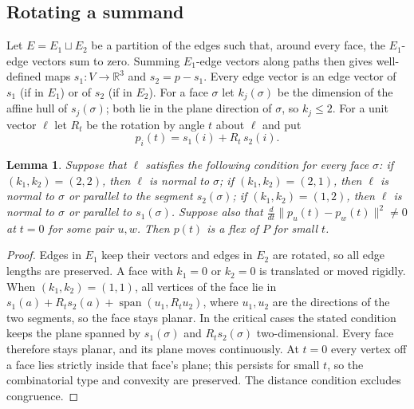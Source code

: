 \documentclass[11pt]{amsart}
\newtheorem{lemma}[theorem]{Lemma}
\theoremstyle{remark}
\newcommand{\R}{\mathbb R}
\begin{document}
\subsection{Rotating a summand}
Let $E=E_1\sqcup E_2$ be a partition of the edges such that, around every face, the $E_1$-edge vectors sum to zero. Summing $E_1$-edge vectors along paths then gives well-defined maps $s_1:V\to\R^3$ and $s_2=p-s_1$. Every edge vector is an edge vector of $s_1$ (if in $E_1$) or of $s_2$ (if in $E_2$). For a face $\sigma$ let $k_j(\sigma)$ be the dimension of the affine hull of $s_j(\sigma)$; both lie in the plane direction of $\sigma$, so $k_j\le2$. For a unit vector $\ell$ let $R_t$ be the rotation by angle $t$ about $\ell$ and put
\[
p_i(t)=s_1(i)+R_t\,s_2(i).
\]

\begin{lemma}\label{lem:mink}
Suppose that $\ell$ satisfies the following condition for every face $\sigma$: if $(k_1,k_2)=(2,2)$, then $\ell$ is normal to $\sigma$; if $(k_1,k_2)=(2,1)$, then $\ell$ is normal to $\sigma$ or parallel to the segment $s_2(\sigma)$; if $(k_1,k_2)=(1,2)$, then $\ell$ is normal to $\sigma$ or parallel to $s_1(\sigma)$. Suppose also that $\frac{d}{dt}\|p_u(t)-p_w(t)\|^2\neq0$ at $t=0$ for some pair $u,w$. Then $p(t)$ is a flex of $P$ for small $t$.
\end{lemma}

\begin{proof}
Edges in $E_1$ keep their vectors and edges in $E_2$ are rotated, so all edge lengths are preserved. A face with $k_1=0$ or $k_2=0$ is translated or moved rigidly. When $(k_1,k_2)=(1,1)$, all vertices of the face lie in $s_1(a)+R_ts_2(a)+\operatorname{span}(u_1,R_tu_2)$, where $u_1,u_2$ are the directions of the two segments, so the face stays planar. In the critical cases the stated condition keeps the plane spanned by $s_1(\sigma)$ and $R_ts_2(\sigma)$ two-dimensional. Every face therefore stays planar, and its plane moves continuously. At $t=0$ every vertex off a face lies strictly inside that face's plane; this persists for small $t$, so the combinatorial type and convexity are preserved. The distance condition excludes congruence.
\end{proof}
\end{document}
